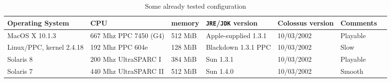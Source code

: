 \documentclass{article}
\begin{document}
\begin{table}
\begin{tabular}{|p{2.5cm}|p{2.5cm}|p{1.8cm}|p{2.5cm}|p{2.5cm}|p{1.8cm}|p{1.8cm}|}

\hline

\textbf{Operating System} & \textbf{CPU} & \textbf{memory} &  \textbf{\texttt{JRE}/\texttt{JDK} version} & \textbf{Colossus version} & \textbf{Comments}\\

\hline

MacOS X 10.1.3 & 667 Mhz PPC 7450 (G4) & 512 MiB & Apple-supplied 1.3.1 & 10/03/2002 & Playable \\

\hline

Linux/PPC, kernel 2.4.18 & 192 Mhz PPC 604e & 128 MiB & Blackdown 1.3.1 PPC & 10/03/2002 & Slow \\

\hline

Solaris 8 & 200 Mhz UltraSPARC I & 384 MiB & Sun 1.3.1 & 10/03/2002 & Playable \\

\hline

Solaris 7 & 440 Mhz UltraSPARC II & 512 MiB & Sun 1.4.0 & 10/03/2002 & Smooth \\

\hline

\end{tabular}
\caption{Some already tested configuration}
\label{TESTED}
\end{table}



\end{document}
